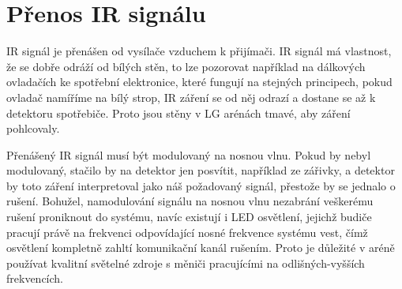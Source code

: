 \section{Přenos IR signálu}
IR signál je přenášen od vysílače vzduchem k přijímači. IR signál má vlastnost, že se dobře odráží od bílých stěn, to lze pozorovat například na dálkových ovladačích ke spotřební elektronice, které fungují na stejných principech, pokud ovladač namíříme na bílý strop, IR záření se od něj odrazí a dostane se až k detektoru spotřebiče. Proto jsou stěny v LG arénách tmavé, aby záření pohlcovaly.

Přenášený IR signál musí být modulovaný na nosnou vlnu. Pokud by nebyl modulovaný, stačilo by na detektor jen posvítit, například ze zářivky, a detektor by toto záření interpretoval jako náš požadovaný signál, přestože by se jednalo o rušení. Bohužel, namodulování signálu na nosnou vlnu nezabrání veškerému rušení proniknout do systému, navíc existují i LED osvětlení, jejichž budiče pracují právě na frekvenci odpovídající nosné frekvence systému vest, čímž osvětlení kompletně zahltí komunikační kanál rušením. Proto je důležité v aréně používat kvalitní světelné zdroje s měniči pracujícími na odlišných-vyšších frekvencích.

